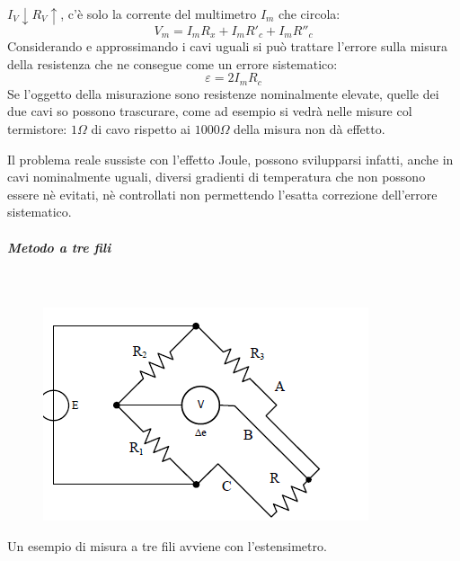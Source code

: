 \documentclass[a4paper, 15pt]{article}
\begin{document}
\begin{adjustwidth}{2in}{}
		$I_V\downarrow R_V\uparrow$, c'è solo la corrente del multimetro $I_m$ che circola:
		\[V_m = I_mR_x+I_mR'_c+I_mR''_c\]
		Considerando e approssimando i cavi uguali si può trattare l'errore sulla misura della resistenza che ne consegue come un errore sistematico:
		\[\varepsilon=2I_mR_c\]
		Se l'oggetto della misurazione sono resistenze nominalmente elevate, quelle dei due cavi so possono trascurare, come ad esempio si vedrà nelle misure col termistore: $1\Omega$ di cavo rispetto ai $1000\Omega$ della misura non dà effetto. \newline 
		
		Il problema reale sussiste con l'effetto Joule, possono svilupparsi infatti, anche in cavi nominalmente uguali, diversi gradienti di temperatura che non possono essere nè evitati, nè controllati non permettendo l'esatta correzione dell'errore sistematico.  
		
		\subparagraph{Metodo a tre fili} \mbox{} \\
		\begin{figure}[H]
			\centering
			\includegraphics[width=0.5\linewidth]{fig/screenshot021}
			\label{fig:screenshot021}
		\end{figure}
		Un esempio di misura a tre fili avviene con l'estensimetro. \newline 
		

\end{adjustwidth}
\end{document}
